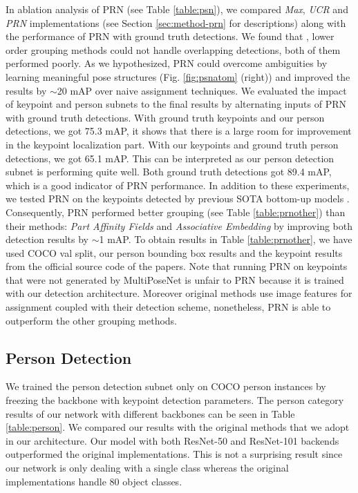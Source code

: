 \documentclass[runningheads]{llncs}
\begin{document}
In ablation analysis of PRN (see Table \ref{table:psn}), we compared \textit{Max}, \textit{UCR} and \textit{PRN} implementations (see Section \ref{sec:method-prn} for descriptions) along with the performance of PRN with ground truth detections. We found that , lower order grouping methods could not  handle overlapping detections, both of them performed poorly. As we hypothesized, PRN could overcome ambiguities by learning meaningful pose structures (Fig. \ref{fig:psnatom} (right)) and improved the results by $\sim$20 mAP over naive assignment techniques. We evaluated the impact of keypoint and person subnets to the final results by alternating inputs of PRN with ground truth detections. With ground truth keypoints and our person detections, we got 75.3 mAP,  it shows that there is a large room for improvement in the keypoint localization part. With our keypoints and ground truth person detections, we got 65.1 mAP. This can be interpreted as our person detection subnet is performing quite well. Both ground truth detections got 89.4 mAP, which is a good indicator of PRN performance. In addition to these experiments, we tested PRN on the keypoints detected by previous SOTA bottom-up models \cite{Cao2016,Newell2016b}. Consequently, PRN performed better grouping (see Table \ref{table:prnother}) than their methods: \textit{Part Affinity Fields}\cite{Cao2016} and \textit{Associative Embedding}\cite{Newell2016b} by improving both detection results by $\sim$1 mAP. To obtain results in Table \ref{table:prnother}, we have used COCO val split, our person bounding box results and the keypoint results from the official source code of the papers.     Note that running PRN on keypoints that were not generated by MultiPoseNet is unfair to PRN because it is trained with our detection architecture. Moreover original methods use image features for assignment coupled with their detection scheme, nonetheless, PRN is able to outperform the other grouping methods.    
\subsection{Person Detection}
We trained the person detection subnet only on COCO person instances by freezing the backbone with keypoint detection parameters. The person category results of our network with different backbones can be seen in Table \ref{table:person}. We compared our results with the original methods that we adopt in our architecture. Our model with both ResNet-50 and ResNet-101 backends outperformed the original implementations. This is not a surprising result since our network is only dealing with a single class whereas the original implementations handle $80$ object classes. 
\end{document}
